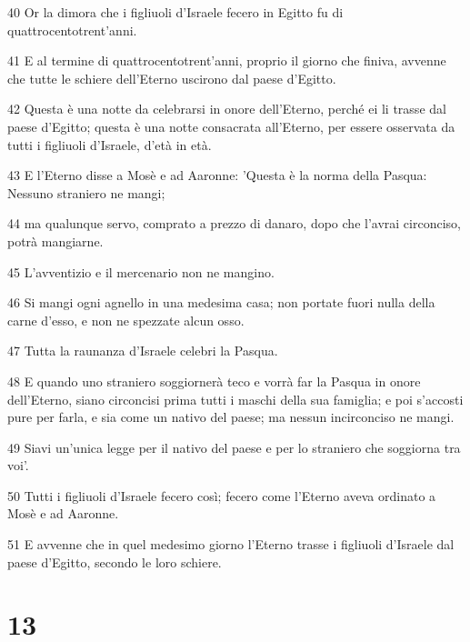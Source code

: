 \par 40 Or la dimora che i figliuoli d'Israele fecero in Egitto fu di quattrocentotrent'anni.
\par 41 E al termine di quattrocentotrent'anni, proprio il giorno che finiva, avvenne che tutte le schiere dell'Eterno uscirono dal paese d'Egitto.
\par 42 Questa è una notte da celebrarsi in onore dell'Eterno, perché ei li trasse dal paese d'Egitto; questa è una notte consacrata all'Eterno, per essere osservata da tutti i figliuoli d'Israele, d'età in età.
\par 43 E l'Eterno disse a Mosè e ad Aaronne: 'Questa è la norma della Pasqua: Nessuno straniero ne mangi;
\par 44 ma qualunque servo, comprato a prezzo di danaro, dopo che l'avrai circonciso, potrà mangiarne.
\par 45 L'avventizio e il mercenario non ne mangino.
\par 46 Si mangi ogni agnello in una medesima casa; non portate fuori nulla della carne d'esso, e non ne spezzate alcun osso.
\par 47 Tutta la raunanza d'Israele celebri la Pasqua.
\par 48 E quando uno straniero soggiornerà teco e vorrà far la Pasqua in onore dell'Eterno, siano circoncisi prima tutti i maschi della sua famiglia; e poi s'accosti pure per farla, e sia come un nativo del paese; ma nessun incirconciso ne mangi.
\par 49 Siavi un'unica legge per il nativo del paese e per lo straniero che soggiorna tra voi'.
\par 50 Tutti i figliuoli d'Israele fecero così; fecero come l'Eterno aveva ordinato a Mosè e ad Aaronne.
\par 51 E avvenne che in quel medesimo giorno l'Eterno trasse i figliuoli d'Israele dal paese d'Egitto, secondo le loro schiere.

\chapter{13}

